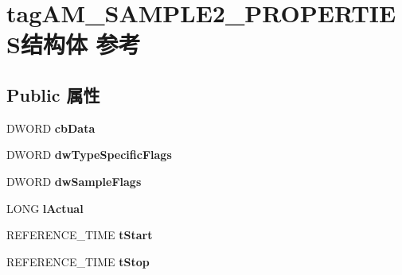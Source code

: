 \hypertarget{structtag_a_m___s_a_m_p_l_e2___p_r_o_p_e_r_t_i_e_s}{}\section{tag\+A\+M\+\_\+\+S\+A\+M\+P\+L\+E2\+\_\+\+P\+R\+O\+P\+E\+R\+T\+I\+E\+S结构体 参考}
\label{structtag_a_m___s_a_m_p_l_e2___p_r_o_p_e_r_t_i_e_s}
\subsection*{Public 属性}
\begin{DoxyCompactItemize}
\item 
\mbox{\label{structtag_a_m___s_a_m_p_l_e2___p_r_o_p_e_r_t_i_e_s_ae8df29c5958da32b2de5935f6eadcc10}} 
D\+W\+O\+RD {\bfseries cb\+Data}
\item 
\mbox{\label{structtag_a_m___s_a_m_p_l_e2___p_r_o_p_e_r_t_i_e_s_a05bdf3f4546f5ed66e4833534e57ab41}} 
D\+W\+O\+RD {\bfseries dw\+Type\+Specific\+Flags}
\item 
\mbox{\label{structtag_a_m___s_a_m_p_l_e2___p_r_o_p_e_r_t_i_e_s_ad84db829ee9b79ccc9f3fe797b1fb896}} 
D\+W\+O\+RD {\bfseries dw\+Sample\+Flags}
\item 
\mbox{\label{structtag_a_m___s_a_m_p_l_e2___p_r_o_p_e_r_t_i_e_s_a435df2af084277802919bac3ba5e5292}} 
L\+O\+NG {\bfseries l\+Actual}
\item 
\mbox{\label{structtag_a_m___s_a_m_p_l_e2___p_r_o_p_e_r_t_i_e_s_a8247145c4758f0bfafad012c67284b34}} 
R\+E\+F\+E\+R\+E\+N\+C\+E\+\_\+\+T\+I\+ME {\bfseries t\+Start}
\item 
\mbox{\label{structtag_a_m___s_a_m_p_l_e2___p_r_o_p_e_r_t_i_e_s_a5578828f3e92daeec39d790704ecee64}} 
R\+E\+F\+E\+R\+E\+N\+C\+E\+\_\+\+T\+I\+ME {\bfseries t\+Stop}
\item 
\mbox{\label{structtag_a_m___s_a_m_p_l_e2___p_r_o_p_e_r_t_i_e_s_a67449d84261e7ccddb8dd77b6abacde7}} 

\end{DoxyCompactItemize}
